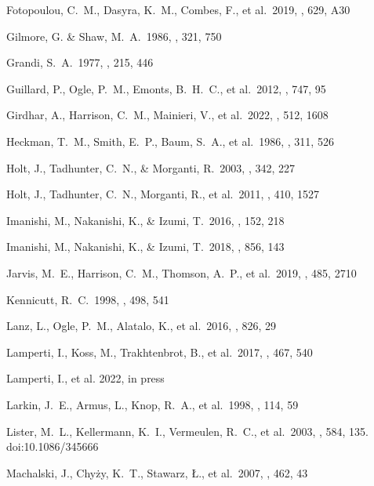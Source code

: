 \documentclass{aa}
\begin{document}
\begin{thebibliography}
 Fotopoulou, C.~M., Dasyra, K.~M., Combes, F., et al.\ 2019, \aap, 629, A30

 Gilmore, G. \& Shaw, M.~A.\ 1986, \nat, 321, 750

 Grandi, S.~A.\ 1977, \apj, 215, 446

 Guillard, P., Ogle, P.~M., Emonts, B.~H.~C., et al.\ 2012, \apj, 747, 95

 Girdhar, A., Harrison, C.~M., Mainieri, V., et al.\ 2022, \mnras, 512, 1608

 Heckman, T.~M., Smith, E.~P., Baum, S.~A., et al.\ 1986, \apj, 311, 526

 Holt, J., Tadhunter, C.~N., \& Morganti, R.\ 2003, \mnras, 342, 227

 Holt, J., Tadhunter, C.~N., Morganti, R., et al.\ 2011, \mnras, 410, 1527

 Imanishi, M., Nakanishi, K., \& Izumi, T.\ 2016, \aj, 152, 218

 Imanishi, M., Nakanishi, K., \& Izumi, T.\ 2018, \apj, 856, 143

 Jarvis, M.~E., Harrison, C.~M., Thomson, A.~P., et al.\ 2019, \mnras, 485, 2710

 Kennicutt, R.~C.\ 1998, \apj, 498, 541

 Lanz, L., Ogle, P.~M., Alatalo, K., et al.\ 2016, \apj, 826, 29

  
 Lamperti, I., Koss, M., Trakhtenbrot, B., et al.\ 2017, \mnras, 467, 540

 Lamperti, I., et al. 2022, in press 

 Larkin, J.~E., Armus, L., Knop, R.~A., et al.\ 1998, \apjs, 114, 59

 Lister, M.~L., Kellermann, K.~I., Vermeulen, R.~C., et al.\ 2003, \apj, 584, 135. doi:10.1086/345666

 Machalski, J., Chy{\.z}y, K.~T., Stawarz, {\L}., et al.\ 2007, \aap, 462, 43


\end{thebibliography}
\end{document}

